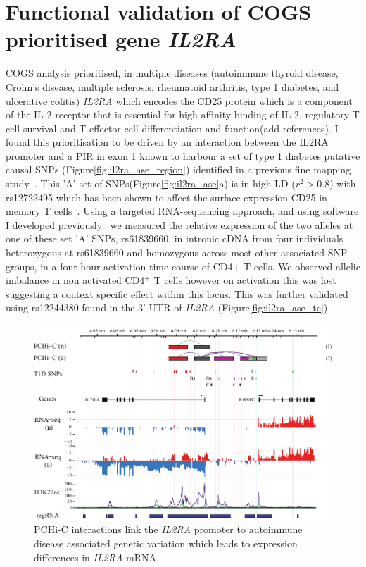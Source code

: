 \documentclass[a4paper,11pt]{report}
\begin{document}
\section{Functional validation of COGS prioritised gene \textit{IL2RA}}
COGS analysis prioritised, in multiple diseases (autoimmune thyroid disease, Crohn's disease, multiple sclerosis, rheumatoid arthritis, type 1 diabetes, and ulcerative colitis) \textit{IL2RA} which encodes the CD25 protein which is a component of the IL-2 receptor that is essential for high-affinity binding of IL-2, regulatory T cell survival and T effector cell differentiation and function(add references). I found this prioritisation to be driven by an interaction between the IL2RA promoter and a PIR in exon 1 known to harbour a set of type 1 diabetes putative causal SNPs (Figure\ref{fig:il2ra_ase_region}) identified in a previous fine mapping study~\citep{WallaceCutlerPontikosEtAl2015}. This 'A' set of SNPs(Figure\ref{fig:il2ra_ase}a) is in high LD ($r^{2} > 0.8$) with rs12722495 which has been shown to affect the surface expression CD25 in memory T cells~\citep{DendrouPlagnolFungEtAl2009}. Using a targeted RNA-sequencing approach, and using software I developed previously~\citep{RainbowYangBurrenEtAl2015} we measured the relative expression of the two alleles at one of these set 'A' SNPs, rs61839660, in intronic cDNA from four individuals heterozygous at rs61839660 and homozygous across most other associated SNP groups, in a four-hour activation time-course of CD4+ T cells. We observed allelic imbalance in non activated CD4$^{+}$ T cells however on activation this was lost suggesting a context specific effect within this locus. This was further validated using rs12244380 found in the 3' UTR of \textit{IL2RA} (Figure\ref{fig:il2ra_ase_tc}). 

\begin{figure}[h]
\includegraphics[width=\textwidth]{il2ra_ase_region.pdf}
\caption{PCHi-C interactions link the \textit{IL2RA} promoter to autoimmune disease associated genetic variation which leads to expression differences in \textit{IL2RA} mRNA.}
\label{fig:il2ra_ase_reg}
\end{figure}
\end{document}
